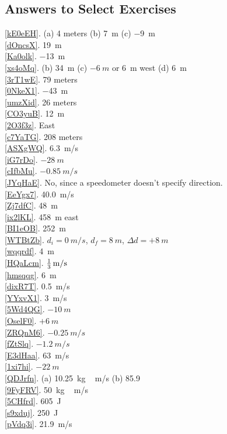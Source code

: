 \documentclass[main.tex]{subfiles}
\begin{document}
\clearpage
\subsection{Answers to Select Exercises}

\ref{kE0eEH}. (a) 4 meters \hspace{1em} (b) \SI{+7}{m} \hspace{1em} (c) \SI{-9}{m}\\
\ref{dOncsX}. \SI{19}{m}\\
\ref{Ka0olk}. \SI{-13}{m}\\
\ref{xs4oMq}. (b) \SI{34}{m} \hspace{2em} (c) $-\SI{6}{m}$ or \SI{6}{m} west \hspace{2em} (d) \SI{6}{m}\\ 
\ref{3rT1wE}. 79 meters\\
\ref{0NkeX1}. \SI{-43}{m}\\
\ref{umzXid}. 26 meters\\
\ref{CO3yuB}. \SI{12}{m}\\
\ref{2O3f3z}. East\\
\ref{c7YaTG}. 208 meters\\
\ref{ASXgWQ}. \SI{6.3}{m/s}\\
\ref{iG7rDo}. $-\SI{28}{m}$\\
\ref{cIfbMu}. $-\SI{0.85}{m/s}$\\
\ref{JYqHaE}. No, since a speedometer doesn't specify direction.\\
\ref{EeYgx7}. \SI{40.0}{m/s}\\
\ref{Zj7dfC}. \SI{48}{m}\\
\ref{ix2lKL}. \SI{458}{m} east\\
\ref{BI1eOB}. \SI{252}{m}\\
\ref{WTBtZb}. $d_i=\SI{0}{m/s}$, $d_f=\SI{8}{m}$, $\Delta{d} = +\SI{8}{m}$\\
\ref{wqqrdf}. \SI{4}{m}\\
\ref{HQaLcm}. $\SI[parse-numbers = false]{\frac{1}{3}}{m/s}$\\
\ref{hmsqqg}. \SI{6}{m}\\
\ref{dixR7T}. \SI{0.5}{m/s}\\
\ref{YYxvX1}. \SI{3}{m/s}\\
\ref{5Wd4QG}. $-\SI{10}{m}$\\
\ref{OselF0}. $+\SI{6}{m}$\\
\ref{ZRQnM6}. $-\SI{0.25}{m/s}$\\
\ref{fZtSlq}. $-\SI{1.2}{m/s}$\\
\ref{E3dHaa}. \SI{63}{m/s}\\
\ref{1xi7hi}. $-\SI{22}{m}$\\
\ref{QDJrfn}. (a) \SI{10.25}{kg\,m/s} \hspace{1em} (b) 85.9\\
\ref{9FyFRV}. \SI{50}{kg\,m/s}\\
\ref{5CHfrd}. \SI{605}{J}\\
\ref{s9xduj}. \SI{250}{J}\\
\ref{pVdq3i}. \SI{21.9}{m/s}
\end{document}
